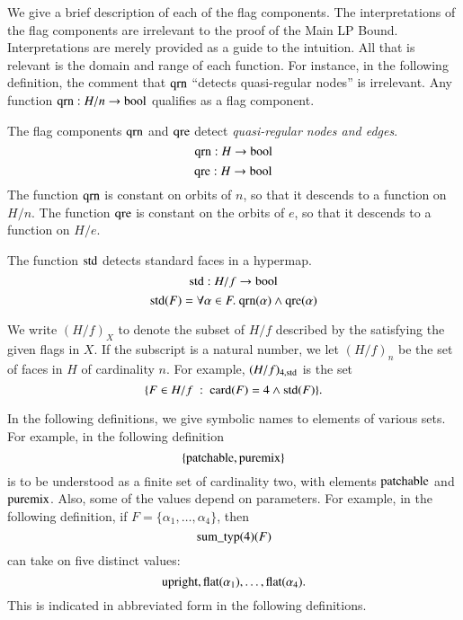 We give a brief description of each of the flag components.  The
interpretations of the flag components are irrelevant to the proof
of the Main LP Bound.  Interpretations are merely provided as a
guide to the intuition.  All that is relevant is the domain and
range of each function.  For instance, in the following
definition, the comment that ${\operatorname{qrn}}$ ``detects quasi-regular
nodes'' is irrelevant.  Any function ${\operatorname{qrn}}:H/n\to\operatorname{bool}$
qualifies as a flag component.

 \begin{definition}
 The flag components ${\operatorname{qrn}}$ and ${\operatorname{qre}}$ detect {\it quasi-regular
 nodes and edges}.
        $${\operatorname{qrn}}:H \to \operatorname{bool}$$
        $${\operatorname{qre}}:H \to \operatorname{bool}$$
 The function ${\operatorname{qrn}}$ is constant on orbits of $n$, so that it
 descends to a function on $H/n$.  The function ${\operatorname{qre}}$ is
 constant on the orbits of $e$, so that it descends to a function
 on $H/e$.
\end{definition}

\begin{definition} The function ${\operatorname{std}}$ detects standard faces
in a hypermap.
    $${\operatorname{std}}:H/f \to \operatorname{bool}$$
$${\operatorname{std}}(F) = \forall\alpha\in F.\
{\operatorname{qrn}}(\alpha)\wedge {\operatorname{qre}}(\alpha)
$$
\end{definition}

\begin{notation}
We write $(H/f)_X$ to denote the subset of $H/f$ described by the
satisfying the given flags in $X$.  If the subscript is a natural
number, we let $(H/f)_n$ be the set of faces in $H$ of cardinality
$n$.  For example, $(H/f)_{4,{\operatorname{std}}}$ is the set
    $$
    \{F \in H/f \ :\  {\operatorname{card}}(F) = 4 \wedge {\operatorname{std}}(F)\}.
    $$
\end{notation}



In the following definitions, we give symbolic names to elements
of various sets.  For example, in the following definition
    $$\{{\operatorname{patchable}},{\operatorname{puremix}}\}$$
is to be understood as a finite set of cardinality two, with
elements ${\operatorname{patchable}}$ and ${\operatorname{puremix}}$.  Also, some of the
values depend on parameters.  For example, in the following
definition, if $F=\{\alpha_1,\ldots,\alpha_4\}$, then
    $$
    {\operatorname{sum\_typ}}(4)(F)
    $$
can take on five distinct values:
    $$
    {\operatorname{upright}}, {\operatorname{flat}}(\alpha_1), \ldots,
    {\operatorname{flat}}(\alpha_4).
    $$
This is indicated in abbreviated form in the following
definitions.

